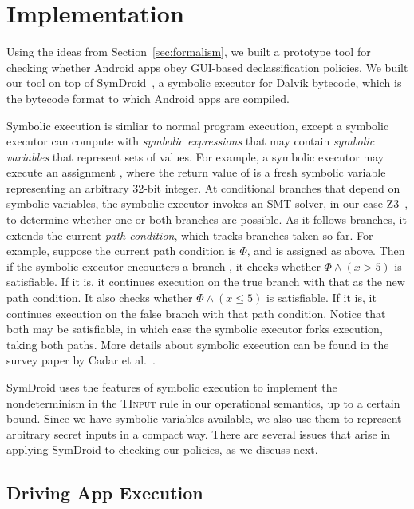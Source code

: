 \documentclass[10pt,conference,compsocconf]{IEEEtran}
\newcommand{\code}[1]{\text{\lstinline!#1!}}
\begin{document}
\section{Implementation}
\label{sec:implementation}

Using the ideas from Section~\ref{sec:formalism}, we built a prototype
tool for checking whether Android apps obey GUI-based declassification
policies. We built our tool on top of SymDroid~\cite{Jeon:2012}, a
symbolic executor for Dalvik bytecode, which is the bytecode format to
which Android apps are compiled.

Symbolic execution \cite{King:1976} is simliar to normal program
execution, except a symbolic executor can compute with \emph{symbolic
  expressions} that may contain \emph{symbolic variables} that
represent sets of values. For example, a symbolic executor may execute
an assignment \code{int x=new_sym()}, where the return value of
\code{new_sym} is a fresh symbolic variable representing an arbitrary
32-bit integer.  At conditional branches that depend on symbolic
variables, the symbolic executor invokes an SMT solver, in our case
Z3~\cite{deMoura:2008}, to determine whether one or both branches are
possible. As it follows branches, it extends the current \emph{path
  condition}, which tracks branches taken so far. For example, suppose
the current path condition is $\Phi$, and \code{x} is assigned as
above. Then if the symbolic executor encounters a branch \code{if
  (x>5)...}, it checks whether $\Phi\wedge(x>5)$ is satisfiable. If it
is, it continues execution on the true branch with that as the new
path condition. It also checks whether $\Phi\wedge(x\leq 5)$ is
satisfiable. If it is, it continues execution on the false branch with
that path condition. Notice that both may be satisfiable, in which
case the symbolic executor forks execution, taking both
paths. More details about symbolic execution can be found in the
survey paper by Cadar et al.~\cite{Cadar:13}.

SymDroid uses the features of symbolic execution to implement the
nondeterminism in the \textsc{TInput} rule in our operational
semantics, up to a certain bound. Since we have symbolic variables
available, we also use them to represent arbitrary secret inputs in a
compact way. There are several issues that arise in applying SymDroid
to checking our policies, as we discuss next.

\subsection{Driving App Execution}
\end{document}
